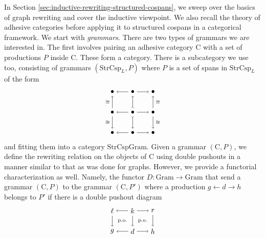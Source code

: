 \documentclass{amsart}
\newcommand{\iso}{\cong}
\newcommand{\C}{\cat{C}}
\newcommand{\Gram}{\cat{Gram}}
\newcommand{\StrCsp}{\cat{StrCsp}}
\newcommand{\StrCspGram}{\cat{StrCspGram}}
\newcommand{\Gram}{\cat{Gram}}
\newcommand{\cat}[1]{\mathrm{#1}}
\newcommand{\from}{\colon}
\renewcommand{\gets}{\leftarrow}
\theoremstyle{remark}
\theoremstyle{definition}
\begin{document}
In Section \ref{sec:inductive-rewriting-structured-cospans}, we sweep
over the basics of graph rewriting and cover the inductive viewpoint.
We also recall the theory of adhesive categories before applying it to
structured cospans in a categorical framework. We start with
\emph{grammars}. There are two types of grammars we are interested in.
The first involves pairing an adhesive category $ \C $ with a set of
productions $ P $ inside $ \C $. These form a category.  There is a
subcategory we use too, consisting of grammars $ ( \StrCsp_L , P ) $
where $ P $ is a set of spans in $ \StrCsp_L $ of the form
%
\[
  \begin{tikzpicture}
    \node (1t) at (0,2) {$ \bullet $};
    \node (2t) at (1,2) {$ \bullet $};
    \node (3t) at (2,2) {$ \bullet $};
    \node (1m) at (0,1) {$ \bullet $};
    \node (2m) at (1,1) {$ \bullet $};
    \node (3m) at (2,1) {$ \bullet $};
    \node (1b) at (0,0) {$ \bullet $};
    \node (2b) at (1,0) {$ \bullet $};
    \node (3b) at (2,0) {$ \bullet $};
    \draw [->] (2t) to node [] {\scriptsize{$  $}} (1t);
    \draw [->] (2t) to node [] {\scriptsize{$  $}} (3t);
    \draw [->] (2m) to node [] {\scriptsize{$  $}} (1m);
    \draw [->] (2m) to node [] {\scriptsize{$  $}} (3m);
    \draw [->] (2b) to node [] {\scriptsize{$  $}} (1b);
    \draw [->] (2b) to node [] {\scriptsize{$  $}} (3b);
    \draw [->] (1m) to node [left] {\scriptsize{$ \iso $}} (1t);
    \draw [->] (1m) to node [left] {\scriptsize{$ \iso $}} (1b);
    \draw [>->] (2m) to node [] {\scriptsize{$  $}} (2t);
    \draw [>->] (2m) to node [] {\scriptsize{$  $}} (2b);
    \draw [->] (3m) to node [right] {\scriptsize{$ \iso $}} (3t);
    \draw [->] (3m) to node [right] {\scriptsize{$ \iso $}} (3b);
  \end{tikzpicture}
\]
% 
and fitting them into a category $ \StrCspGram $.  Given a grammar
$ ( \C , P ) $, we define the rewriting relation on the objects
of $ \C $ using double pushouts in a manner similar to that as
was done for graphs.  However, we provide a functorial characterization
as well. Namely, the functor $ D \from \Gram \to \Gram $
that send a grammar $ ( \C , P ) $ to the grammar $ ( \C
, P') $ where a production $ g \gets d \to h $ belongs to $ P' $ if
there is a double pushout diagram
%
\[
  \begin{tikzpicture}
    \node (1t) at (0,1) {$ \ell $};
    \node (2t) at (1,1) {$ k $};
    \node (3t) at (2,1) {$ r $};
    \node (1b) at (0,0) {$ g $};
    \node (2b) at (1,0) {$ d $};
    \node (3b) at (2,0) {$ h $};
    \draw [->] (2t) to node [] {\scriptsize{$  $}} (1t);
    \draw [->] (2t) to node [] {\scriptsize{$  $}} (3t);
    \draw [->] (2b) to node [] {\scriptsize{$  $}} (1b);
    \draw [->] (2b) to node [] {\scriptsize{$  $}} (3b);
    \draw [->] (1t) to node [] {\scriptsize{$  $}} (1b);
    \draw [->] (2t) to node [] {\scriptsize{$  $}} (2b);
    \draw [->] (3t) to node [] {\scriptsize{$  $}} (3b);
    \node () at (0.5,0.5) {\scriptsize{p.o.}};
    \node () at (1.5,0.5) {\scriptsize{p.o.}};
  \end{tikzpicture}
\]
\end{document}
